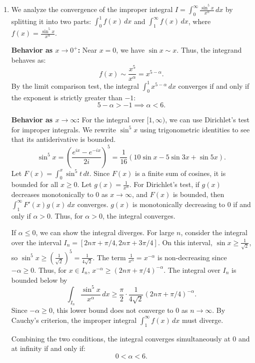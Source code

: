 \documentclass{article}
\begin{document}
\begin{enumerate}[label=\fbox{\arabic*}]
  \item %
        We analyze the convergence of the improper integral $I = \int_0^\infty \frac{\sin^5 x}{x^\alpha} \, dx$ by splitting it into two parts: $\int_0^1 f(x) \, dx$ and $\int_1^\infty f(x) \, dx$, where $f(x) = \frac{\sin^5 x}{x^\alpha}$.
        
        \textbf{Behavior as $x \to 0^+ $:}
        Near $x = 0$, we have $\sin x \sim x$. Thus, the integrand behaves as:
        \[
          f(x) \sim \frac{x^5}{x^\alpha} = x^{5 - \alpha}.
        \]
        By the limit comparison test, the integral $\int_0^1 x^{5-\alpha} \, dx$ converges if and only if the exponent is strictly greater than $-1$:
        \[
          5 - \alpha > -1 \implies \alpha < 6.
        \]
        
        \textbf{Behavior as $x \to \infty$:}
        For the integral over $[1, \infty)$, we can use Dirichlet's test for improper integrals. We rewrite $\sin^5 x$ using trigonometric identities to see that its antiderivative is bounded.
        \[
          \sin^5 x = \left( \frac{e^{ix} - e^{-ix}}{2i} \right)^5 = \frac{1}{16} (10 \sin x - 5 \sin 3x + \sin 5x).
        \]
        Let $F(x) = \int_0^x \sin^5 t \, dt$. Since $F(x)$ is a finite sum of cosines, it is bounded for all $x \ge 0$.
        Let $g(x) = \frac{1}{x^\alpha}$. For Dirichlet's test, if $g(x)$ decreases monotonically to 0 as $x \to \infty$, and $F(x)$ is bounded, then $\int_1^\infty F'(x)g(x) \, dx$ converges.
        $g(x)$ is monotonically decreasing to 0 if and only if $\alpha > 0$. Thus, for $\alpha > 0$, the integral converges.
        
        If $\alpha \le 0$, we can show the integral diverges. For large $n$, consider the integral over the interval $I_n = [2n\pi + \pi/4, 2n\pi + 3\pi/4]$. On this interval, $\sin x \ge \frac{1}{\sqrt{2}}$, so $\sin^5 x \ge \left(\frac{1}{\sqrt{2}}\right)^5 = \frac{1}{4\sqrt{2}}$. 
        The term $\frac{1}{x^\alpha} = x^{-\alpha}$ is non-decreasing since $-\alpha \ge 0$. Thus, for $x \in I_n$, $x^{-\alpha} \ge (2n\pi + \pi/4)^{-\alpha}$.
        The integral over $I_n$ is bounded below by
        \[
          \int_{I_n} \frac{\sin^5 x}{x^\alpha} \, dx \ge \frac{\pi}{2} \cdot \frac{1}{4\sqrt{2}} (2n\pi + \pi/4)^{-\alpha}.
        \]
        Since $-\alpha \ge 0$, this lower bound does not converge to 0 as $n \to \infty$. By Cauchy's criterion, the improper integral $\int_1^\infty f(x) \, dx$ must diverge.
        
        Combining the two conditions, the integral converges simultaneously at 0 and at infinity if and only if:
        \[
          0 < \alpha < 6.
        \]


\end{enumerate}
\end{document}
